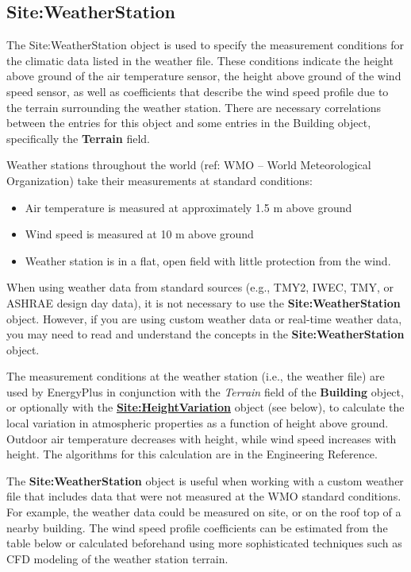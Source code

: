 \subsection{Site:WeatherStation}\label{siteweatherstation}

The Site:WeatherStation object is used to specify the measurement conditions for the climatic data listed in the weather file. These conditions indicate the height above ground of the air temperature sensor, the height above ground of the wind speed sensor, as well as coefficients that describe the wind speed profile due to the terrain surrounding the weather station. There are necessary correlations between the entries for this object and some entries in the Building object, specifically the \textbf{Terrain} field.

Weather stations throughout the world (ref: WMO -- World Meteorological Organization) take their measurements at standard conditions:

\begin{itemize}
\item
  Air temperature is measured at approximately 1.5 m above ground
\item
  Wind speed is measured at 10 m above ground
\item
  Weather station is in a flat, open field with little protection from the wind.
\end{itemize}

When using weather data from standard sources (e.g., TMY2, IWEC, TMY, or ASHRAE design day data), it is not necessary to use the \textbf{Site:WeatherStation} object. However, if you are using custom weather data or real-time weather data, you may need to read and understand the concepts in the \textbf{Site:WeatherStation} object.

The measurement conditions at the weather station (i.e., the weather file) are used by EnergyPlus in conjunction with the \emph{Terrain} field of the \textbf{Building} object, or optionally with the \textbf{\hyperref[siteheightvariation]{Site:HeightVariation}} object (see below), to calculate the local variation in atmospheric properties as a function of height above ground. Outdoor air temperature decreases with height, while wind speed increases with height. The algorithms for this calculation are in the Engineering Reference.

The \textbf{Site:WeatherStation} object is useful when working with a custom weather file that includes data that were not measured at the WMO standard conditions. For example, the weather data could be measured on site, or on the roof top of a nearby building. The wind speed profile coefficients can be estimated from the table below or calculated beforehand using more sophisticated techniques such as CFD modeling of the weather station terrain.

